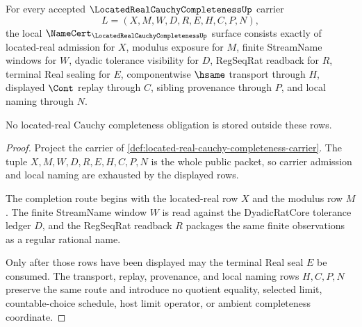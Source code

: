 \begin{theorem}
\label{thm:located-real-cauchy-completeness-namecert-obligations}
For every accepted $\LocatedRealCauchyCompletenessUp$ carrier
$$
L=(X,M,W,D,R,E,H,C,P,N),
$$
the local $\NameCert_{\LocatedRealCauchyCompletenessUp}$ surface consists exactly of located-real admission for $X$, modulus exposure for $M$, finite StreamName windows for $W$, dyadic tolerance visibility for $D$, RegSeqRat readback for $R$, terminal Real sealing for $E$, componentwise $\hsame$ transport through $H$, displayed $\Cont$ replay through $C$, sibling provenance through $P$, and local naming through $N$.

No located-real Cauchy completeness obligation is stored outside these rows.
\end{theorem}
\begin{proof}
Project the carrier of \autoref{def:located-real-cauchy-completeness-carrier}. The tuple $X,M,W,D,R,E,H,C,P,N$ is the whole public packet, so carrier admission and local naming are exhausted by the displayed rows.

The completion route begins with the located-real row $X$ and the modulus row $M$. The finite StreamName window $W$ is read against the DyadicRatCore tolerance ledger $D$, and the RegSeqRat readback $R$ packages the same finite observations as a regular rational name.

Only after those rows have been displayed may the terminal Real seal $E$ be consumed. The transport, replay, provenance, and local naming rows $H,C,P,N$ preserve the same route and introduce no quotient equality, selected limit, countable-choice schedule, host limit operator, or ambient completeness coordinate.
\end{proof}

